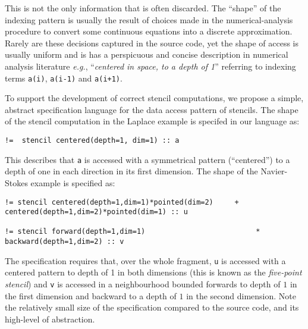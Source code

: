 \documentclass[10pt,preprint]{sigplanconf}
\theoremstyle{definition}
\newcommand{\eg}{\emph{e.g.}}
\begin{document}
This is not the only information that is often discarded. The
``shape'' of the indexing pattern is usually the result of choices made in the
numerical-analysis procedure to convert some
continuous equations into a discrete approximation. Rarely are these
decisions captured in the source code, yet the shape of access is
usually uniform and is has a perspicuous and concise description in
numerical analysis literature \eg{}, ``\emph{centered in space, to a
  depth of 1}'' referring to indexing terms \texttt{a(i)},
\texttt{a(i-1)} and \texttt{a(i+1)}.

To support the development of correct stencil computations, we propose
a simple, abstract specification language for the data access pattern
of stencils. The shape of the stencil computation in the
Laplace example is specifed in our language as:
%
\begin{verbatim}
!=  stencil centered(depth=1, dim=1) :: a
\end{verbatim}
%
This describes that \texttt{a} is accessed with a symmetrical pattern
(``centered'') to a depth of one in each direction in its first
dimension.  The shape of the Navier-Stokes example
is specified as:
%
\begin{verbatim}
!= stencil centered(depth=1,dim=1)*pointed(dim=2)     + centered(depth=1,dim=2)*pointed(dim=1) :: u

!= stencil forward(depth=1,dim=1)                          * backward(depth=1,dim=2) :: v
\end{verbatim}
%
The specification requires that, over the whole fragment, \texttt{u}
is accessed with a centered pattern to depth of 1 in both dimensions
(this is known as the \emph{five-point stencil}) and \texttt{v} is
accessed in a neighbourhood bounded forwards to depth of $1$ in the
first dimension and backward to a depth of $1$ in the second
dimension. Note the relatively small size of the specification
compared to the source code, and its high-level of abstraction.
\end{document}
